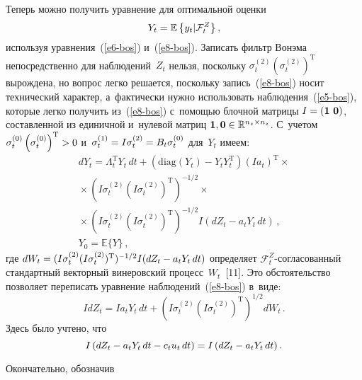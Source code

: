 \begin{multicols}{2}
     Теперь можно получить уравнение для оптимальной оценки 
     $$
     Y_t\hm=  \mathbb{E}\left\{ y_t\vert \mathcal{F}_t^Z\right\},
     $$
      используя уравнения~(\ref{e6-bos}) 
и~(\ref{e8-bos}). Записать фильтр Вонэма непосредственно для 
наблюдений~$Z_t$ нельзя, поскольку $\sigma_t^{(2)} 
\left(\sigma_t^{(2)}\right)^{\mathrm{T}}$ вырождена, но вопрос легко решается, 
поскольку запись~(\ref{e8-bos}) носит технический характер, а~фактически 
нужно использовать наблюдения~(\ref{e5-bos}), которые легко получить 
из~(\ref{e8-bos}) с~помощью блочной матрицы $I\hm= (\mathbf{1}\ 
\mathbf{0})$, составленной из единичной и~нулевой матриц $\mathbf{1}, 
\mathbf{0}\hm\in \mathbb{R}^{n_z\times n_z}$. С~учетом $\sigma_t^{(0)} 
\left( \sigma_t^{(0)}\right)^{\mathrm{T}}\hm>0$ и~$\sigma_t^{(1)}\hm= I\sigma_t^{(2)} 
\hm= B_t\sigma_t^{(0)}$ для~$Y_t$ имеем:
     \begin{multline*}
     dY_t=\Lambda_t^{\mathrm{T}} Y_t\,dt +\left( \mathrm{diag} \left(Y_t\right)-Y_t Y_t^{\mathrm{T}}\right) 
\left(Ia_t\right)^{\mathrm{T}}\times{}\\
{}\times \left( I\sigma_t^{(2)} \left(I\sigma_t^{(2)}\right)^{\mathrm{T}}  
\right)^{-1/2}\times{}\\
     {}\times \left( I\sigma_t^{(2)} \left( I\sigma_t^{(2)}\right)^{\mathrm{T}}\right)^{-1/2} 
I\left( dZ_t-a_tY_t\,dt\right)\,,\\
 Y_0=\mathbb{E}\{Y\}\,,
     \end{multline*}
где $dW_t\hm= (I\sigma_t^{(2)} (I\sigma_t^{(2)})^{\mathrm{T}})^{-1/2} I(dZ_t\hm- a_t Y_t\, 
dt)$ определяет $\mathcal{F}_t^Z$-со\-гла\-со\-ван\-ный стандартный 
векторный винеровский процесс~$W_t$~[11]. Это обстоятельство позволяет 
переписать уравнение наблюдений~(\ref{e8-bos}) в~виде:
$$
IdZ_t=Ia_t Y_t\,dt+\left( I\sigma_t^{(2)} \left( 
I\sigma_t^{(2)} \right)^{\mathrm{T}} \right)^{1/2} dW_t\,.
$$
Здесь было учтено, что 
$$
I\left(dZ_t \hm-a_t Y_t \,dt \hm- c_t u_t\, dt\right)= 
I\left(dZ_t\hm- a_t Y_t \,dt\right).
$$
     
     Окончательно, обозначив
     
     \vspace*{-3pt} 
     

\end{multicols}
